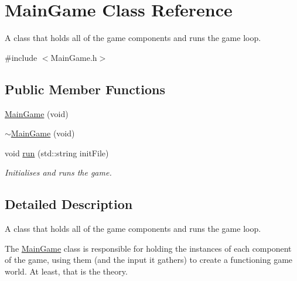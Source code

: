 \hypertarget{class_main_game}{}\section{Main\+Game Class Reference}
\label{class_main_game}


A class that holds all of the game components and runs the game loop.  




{\ttfamily \#include $<$Main\+Game.\+h$>$}

\subsection*{Public Member Functions}
\begin{DoxyCompactItemize}
\item 
\hyperlink{class_main_game_a6269052f9ac8ab60efd1f0d0e4281bb7}{Main\+Game} (void)
\item 
\hyperlink{class_main_game_a5123a0f105001ea90a633d799845e705}{$\sim$\+Main\+Game} (void)
\item 
void \hyperlink{class_main_game_a77f8c32213cbf718b35e96b5ba74cfd3}{run} (std\+::string init\+File)
\begin{DoxyCompactList}\small\item\em Initialises and runs the game. \end{DoxyCompactList}\end{DoxyCompactItemize}


\subsection{Detailed Description}
A class that holds all of the game components and runs the game loop. 

The \hyperlink{class_main_game}{Main\+Game} class is responsible for holding the instances of each component of the game, using them (and the input it gathers) to create a functioning game world. At least, that is the theory.


